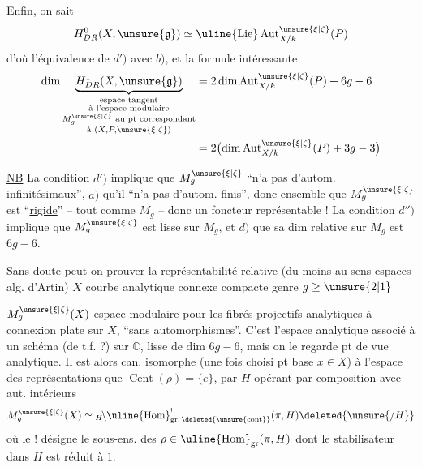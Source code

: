Enfin, on sait
\[
H^0_{DR}(X,\unsure{\mathfrak g})\simeq\uline{\operatorname{Lie}}\operatorname{Aut}^{\unsure{\xi|\zeta}}_{X/k}(P)
\]
d'où l'équivalence de $d')$ avec $b)$, et la formule intéressante
\[
\begin{aligned}
\dim\underbrace{H^1_{DR}(X,\unsure{\mathfrak g})}_{\substack{\text{espace tangent}\\\text{à l'espace modulaire}\\M_g^{\unsure{\xi|\zeta}}\text{ au pt correspondant}\\\text{à }(X,P,\unsure{\xi|\zeta})}}
&=2\dim\operatorname{Aut}^{\unsure{\xi|\zeta}}_{X/k}(P)+6g-6\\
&=2\bigl(\dim\operatorname{Aut}^{\unsure{\xi|\zeta}}_{X/k}(P)+3g-3\bigr)
\end{aligned}
\]

\uline{NB} La condition $d')$ implique que $M_g^{\unsure{\xi|\zeta}}$ ``n'a pas d'autom. infinitésimaux'', $a)$ qu'il ``n'a pas d'autom. finis'', donc ensemble que $M_g^{\unsure{\xi|\zeta}}$ est ``\uline{rigide}'' -- tout comme $M_g$ -- donc un foncteur représentable ! La condition $d'')$ implique que $M_g^{\unsure{\xi|\zeta}}$ est  lisse sur $M_g$, et $d)$ que sa dim relative sur $M_g$ est $6g-6$.

Sans doute peut-on prouver la représentabilité relative (du moins au sens espaces alg. d'Artin)
$X$ courbe analytique connexe compacte genre $g\ge\unsure{2|1}$

$M_g^{\unsure{\xi|\zeta}}(X)$ espace modulaire pour les fibrés projectifs analytiques à connexion plate sur $X$, ``sans automorphismes''. C'est l'espace analytique associé à un schéma (de t.f. ?) sur $\mathbb C$,  lisse de dim $6g-6$, mais on le regarde pt de vue analytique. Il est alors can. isomorphe (une fois choisi pt base $x\in X$) à l'espace des représentations
 que $\operatorname{Cent}(\rho)=\{e\}$, \deleted{\unsure{\#}}  par $H$ opérant par composition avec aut. intérieurs
\[
M_g^{\unsure{\xi|\zeta}}(X)\simeq {}_H\!\backslash\uline{\operatorname{Hom}}^!_{\operatorname{gr.}\deleted{\unsure{\mathrm{cont}}}}(\pi,H)\deleted{\unsure{/H}}
\]
où le $!$ désigne le sous-ens. des $\rho\in\uline{\operatorname{Hom}}_{\operatorname{gr}}(\pi,H)$ dont le stabilisateur dans $H$ est réduit à $1$.

